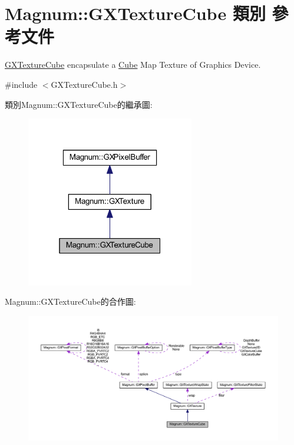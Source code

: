 \hypertarget{class_magnum_1_1_g_x_texture_cube}{}\section{Magnum\+:\+:G\+X\+Texture\+Cube 類別 參考文件}
\label{class_magnum_1_1_g_x_texture_cube}


\hyperlink{class_magnum_1_1_g_x_texture_cube}{G\+X\+Texture\+Cube} encapsulate a \hyperlink{class_magnum_1_1_cube}{Cube} Map Texture of Graphics Device.  




{\ttfamily \#include $<$G\+X\+Texture\+Cube.\+h$>$}



類別\+Magnum\+:\+:G\+X\+Texture\+Cube的繼承圖\+:\nopagebreak
\begin{figure}[H]
\begin{center}
\leavevmode
\includegraphics[width=208pt]{class_magnum_1_1_g_x_texture_cube__inherit__graph}
\end{center}
\end{figure}


Magnum\+:\+:G\+X\+Texture\+Cube的合作圖\+:\nopagebreak
\begin{figure}[H]
\begin{center}
\leavevmode
\includegraphics[width=350pt]{class_magnum_1_1_g_x_texture_cube__coll__graph}
\end{center}
\end{figure}
